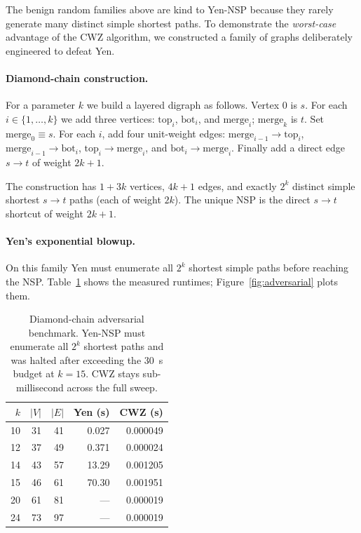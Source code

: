 The benign random families above are kind to Yen-NSP because they rarely
generate many distinct simple shortest paths. To demonstrate the
\emph{worst-case} advantage of the CWZ algorithm, we constructed a family
of graphs deliberately engineered to defeat Yen.

\paragraph{Diamond-chain construction.} For a parameter $k$ we build a
layered digraph as follows. Vertex $0$ is $s$. For each $i\in\{1,\dots,k\}$
we add three vertices: $\text{top}_i$, $\text{bot}_i$, and $\text{merge}_i$;
$\text{merge}_k$ is $t$. Set $\text{merge}_0\equiv s$. For each $i$, add
four unit-weight edges:
$\text{merge}_{i-1}\to\text{top}_i$, $\text{merge}_{i-1}\to\text{bot}_i$,
$\text{top}_i\to\text{merge}_i$, and $\text{bot}_i\to\text{merge}_i$.
Finally add a direct edge $s\to t$ of weight $2k+1$.

The construction has $1+3k$ vertices, $4k+1$ edges, and exactly $2^{k}$
distinct simple shortest $s\to t$ paths (each of weight $2k$). The unique
NSP is the direct $s\to t$ shortcut of weight $2k+1$.

\paragraph{Yen's exponential blowup.} On this family Yen must enumerate all
$2^{k}$ shortest simple paths before reaching the NSP. Table~\ref{tab:adv}
shows the measured runtimes; Figure~\ref{fig:adversarial} plots them.

\begin{table}
  \centering
  \begin{tabular}{rrrrr}
  \toprule
  $k$ & $|V|$ & $|E|$ & Yen (s) & CWZ (s) \\
  \midrule
  10 & 31 & 41 & 0.027  & 0.000049 \\
  12 & 37 & 49 & 0.371  & 0.000024 \\
  14 & 43 & 57 & 13.29  & 0.001205 \\
  15 & 46 & 61 & 70.30  & 0.001951 \\
  20 & 61 & 81 & ---    & 0.000019 \\
  24 & 73 & 97 & ---    & 0.000019 \\
  \bottomrule
  \end{tabular}
  \caption{Diamond-chain adversarial benchmark. Yen-NSP must enumerate all
    $2^{k}$ shortest paths and was halted after exceeding the $30$~s budget
    at $k=15$. CWZ stays sub-millisecond across the full sweep.}
  \label{tab:adv}
\end{table}

